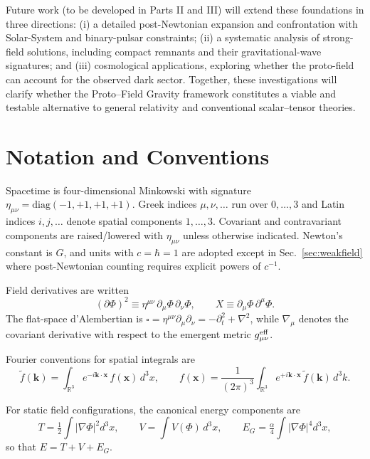 \documentclass{article}
\begin{document}
Future work (to be developed in Parts II and III) will extend these foundations in three directions: (i) a detailed post-Newtonian expansion and confrontation with Solar-System and binary-pulsar constraints; (ii) a systematic analysis of strong-field solutions, including compact remnants and their gravitational-wave signatures; and (iii) cosmological applications, exploring whether the proto-field can account for the observed dark sector. Together, these investigations will clarify whether the Proto--Field Gravity framework constitutes a viable and testable alternative to general relativity and conventional scalar--tensor theories.

\appendix
\section{Notation and Conventions}
\label{app:notation}

Spacetime is four-dimensional Minkowski with signature 
$\eta_{\mu\nu}=\mathrm{diag}(-1,+1,+1,+1)$. 
Greek indices $\mu,\nu,\dots$ run over $0,\dots,3$ and Latin indices 
$i,j,\dots$ denote spatial components $1,\dots,3$. 
Covariant and contravariant components are raised/lowered with $\eta_{\mu\nu}$ unless otherwise indicated. 
Newton’s constant is $G$, and units with $c=\hbar=1$ are adopted except in Sec.~\ref{sec:weakfield} where post-Newtonian counting requires explicit powers of $c^{-1}$.

Field derivatives are written 
\begin{equation}
(\partial\Phi)^2 \equiv \eta^{\mu\nu}\,\partial_\mu\Phi\,\partial_\nu\Phi, 
\qquad 
X \equiv \partial_\mu\Phi\,\partial^\mu\Phi .
\end{equation}
The flat-space d’Alembertian is 
$\square = \eta^{\mu\nu}\partial_\mu\partial_\nu = -\partial_t^2+\nabla^2$, 
while $\nabla_\mu$ denotes the covariant derivative with respect to the emergent metric $g^{\rm eff}_{\mu\nu}$.

Fourier conventions for spatial integrals are
\begin{equation}
\tilde f(\mathbf{k}) = \int_{\mathbb{R}^3}\! e^{-i\mathbf{k}\cdot\mathbf{x}}\, f(\mathbf{x})\, d^3x,
\qquad
f(\mathbf{x}) = \frac{1}{(2\pi)^3}\int_{\mathbb{R}^3}\! e^{+i\mathbf{k}\cdot\mathbf{x}}\, \tilde f(\mathbf{k})\, d^3k.
\end{equation}

For static field configurations, the canonical energy components are
\begin{equation}
T = \tfrac12 \int |\nabla\Phi|^2 d^3x, 
\qquad
V = \int V(\Phi)\, d^3x, 
\qquad
E_G = \tfrac{\alpha}{4}\int |\nabla\Phi|^4 d^3x,
\end{equation}
so that $E = T+V+E_G$.
\end{document}
